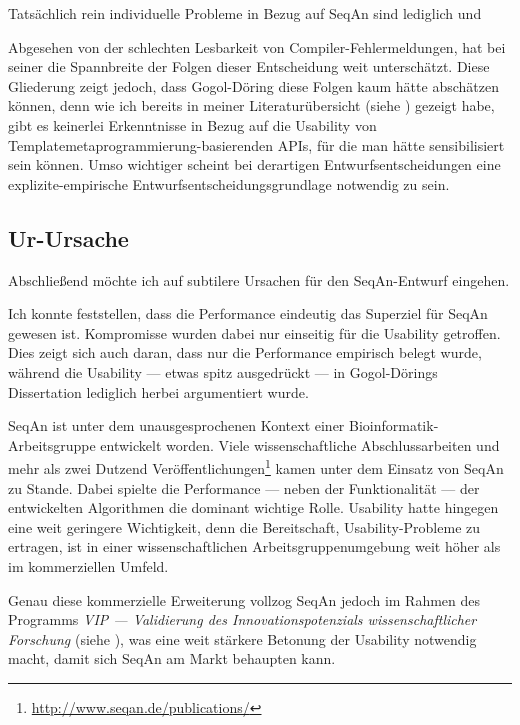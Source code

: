 Tatsächlich rein individuelle Probleme in Bezug auf SeqAn sind lediglich  und 

Abgesehen von der schlechten Lesbarkeit von Compiler-Fehlermeldungen, hat \cite{GogolDoring:2009vz} bei seiner   die Spannbreite der Folgen dieser Entscheidung weit unterschätzt. Diese Gliederung zeigt jedoch, dass Gogol-Döring diese Folgen kaum hätte abschätzen können, denn wie ich bereits in meiner Literaturübersicht (siehe ) gezeigt habe, gibt es keinerlei Erkenntnisse in Bezug auf die Usability von Templatemetaprogrammierung-basierenden APIs, für die man hätte sensibilisiert sein können. Umso wichtiger scheint bei derartigen Entwurfsentscheidungen eine explizite-empirische Entwurfsentscheidungsgrundlage notwendig zu sein.

\subsection{Ur-Ursache}
\label{sec:gt-urursache}
Abschließend möchte ich auf subtilere Ursachen für den SeqAn-Entwurf eingehen.

Ich konnte feststellen, dass die Performance eindeutig das Superziel für SeqAn gewesen ist. Kompromisse wurden dabei nur einseitig für die Usability getroffen. Dies zeigt sich auch daran, dass nur die Performance empirisch belegt wurde, während die Usability --- etwas spitz ausgedrückt --- in Gogol-Dörings Dissertation \citep{GogolDoring:2009vz} lediglich herbei argumentiert wurde.

SeqAn ist unter dem unausgesprochenen Kontext einer Bioinformatik-Arbeitsgruppe entwickelt worden. Viele wissenschaftliche Abschlussarbeiten und mehr als zwei Dutzend Veröffentlichungen\footnote{\url{http://www.seqan.de/publications/}} kamen unter dem Einsatz von SeqAn zu Stande. Dabei spielte die Performance --- neben der Funktionalität --- der entwickelten Algorithmen die dominant wichtige Rolle. Usability hatte hingegen eine weit geringere Wichtigkeit, denn die Bereitschaft, Usability-Probleme zu ertragen, ist in einer wissenschaftlichen Arbeitsgruppenumgebung weit höher als im kommerziellen Umfeld.

Genau diese kommerzielle Erweiterung vollzog SeqAn jedoch im Rahmen des Programms \textit{VIP --- Validierung des Innovationspotenzials wissenschaftlicher Forschung} (siehe ), was eine weit stärkere Betonung der Usability notwendig macht, damit sich SeqAn am Markt behaupten kann.

